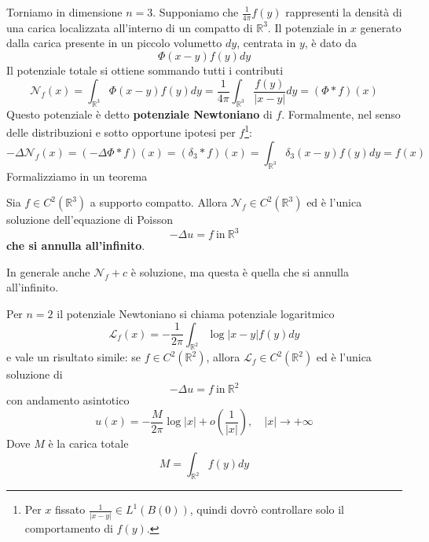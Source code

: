 \documentclass[10pt,a4paper,twoside,openright]{book}
\begin{document}
Torniamo in dimensione $\displaystyle n=3$. Supponiamo che $\displaystyle \frac{1}{4\pi } f(y)$ rappresenti la densità di una carica localizzata all'interno di un compatto di $\displaystyle \mathbb{R}^{3}$. Il potenziale in $\displaystyle x$ generato dalla carica presente in un piccolo volumetto $\displaystyle dy$, centrata in $\displaystyle y$, è dato da
\begin{equation*}
	\Phi (x-y) f(y) dy
\end{equation*}
Il potenziale totale si ottiene sommando tutti i contributi
\begin{equation}
	\mathcal{N}_{f}(x) =\int _{\mathbb{R}^{3}} \Phi (x-y) f(y) dy=\frac{1}{4\pi }\int _{\mathbb{R}^{3}}\frac{f(y)}{| x-y| } dy=(\Phi \ast f)(x)
\end{equation}
Questo potenziale è detto \textbf{potenziale Newtoniano} di $\displaystyle f$. Formalmente, nel senso delle distribuzioni e sotto opportune ipotesi per $\displaystyle f$\footnote{Per $\displaystyle x$ fissato $\displaystyle \frac{1}{| x-y| } \in L^{1}(B(0))$, quindi dovrò controllare solo il comportamento di $\displaystyle f(y)$.}:
\begin{equation*}
	-\Delta \mathcal{N}_{f}(x) =( -\Delta \Phi \ast f)(x) =( \delta _{3} \ast f)(x) =\int _{\mathbb{R}^{3}} \delta _{3}(x-y) f(y) dy=f(x)
\end{equation*}
Formalizziamo in un teorema
\begin{theorem}
	Sia $\displaystyle f\in C^{2}\left(\mathbb{R}^{3}\right)$ a supporto compatto. Allora $\displaystyle \mathcal{N}_{f} \in C^{2}\left(\mathbb{R}^{3}\right)$ ed è l'unica soluzione dell'equazione di Poisson
	\begin{equation*}
		-\Delta u=f\ \text{in} \ \mathbb{R}^{3}
	\end{equation*}
	\textbf{che si annulla all'infinito}.
\end{theorem}
In generale anche $\mathcal{N}_{f}+c$ è soluzione, ma questa è quella che si annulla all'infinito.
\begin{nb}
	Per $\displaystyle n=2$ il potenziale Newtoniano si chiama potenziale logaritmico
	\begin{equation}
		\mathcal{L}_{f}(x) =-\frac{1}{2\pi }\int _{\mathbb{R}^{2}}\log| x-y| f(y) dy
	\end{equation}
	e vale un risultato simile: se $\displaystyle f\in C^{2}(\mathbb{R}^{2})$, allora $\displaystyle \mathcal{L}_{f} \in C^{2}(\mathbb{R}^{2})$ ed è l'unica soluzione di 
	\begin{equation*}
		-\Delta u=f\ \text{in} \ \mathbb{R}^{2}
	\end{equation*}
	con andamento asintotico
	\begin{equation*}
		u(x) =-\frac{M}{2\pi }\log| x| +o\left(\frac{1}{| x| }\right),\quad | x| \rightarrow +\infty 
	\end{equation*}
	Dove $\displaystyle M$ è la carica totale
	\begin{equation*}
		M=\int _{\mathbb{R}^{2}} f(y) dy
	\end{equation*}
\end{nb}
\end{document}

